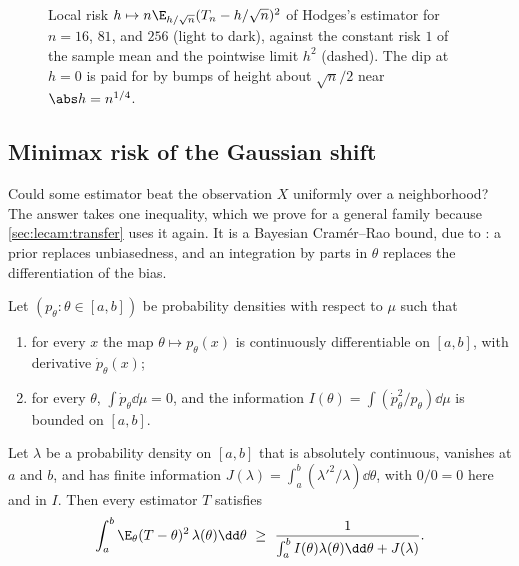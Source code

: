 \begin{refsection}
\begin{figure}[t]
\caption{Local risk $h\mapsto n\E_{h/\sqrt n}(T_n-h/\sqrt n)^2$ of Hodges's estimator for $n=16$, $81$, and $256$ (light to dark), against the constant risk $1$ of the sample mean and the pointwise limit $h^2$ (dashed). The dip at $h=0$ is paid for by bumps of height about $\sqrt n/2$ near $\abs h=n^{1/4}$.}
\label{fig:lecam:hodges}
\end{figure}

\subsection{Minimax risk of the Gaussian shift}

Could some estimator beat the observation $X$ uniformly over a neighborhood? The answer takes one inequality, which we prove for a general family because \cref{sec:lecam:transfer} uses it again. It is a Bayesian Cramér--Rao bound, due to \textcite{vanTrees1968}: a prior replaces unbiasedness, and an integration by parts in $\theta$ replaces the differentiation of the bias.

\begin{lemma}\label{lem:lecam:vantrees}
Let $(p_\theta:\theta\in[a,b])$ be probability densities with respect to $\mu$ such that
\begin{enumerate}[label=(\alph*)]
\item for every $x$ the map $\theta\mapsto p_\theta(x)$ is continuously differentiable on $[a,b]$, with derivative $\dot p_\theta(x)$;
\item for every $\theta$, $\int\dot p_\theta\dd\mu=0$, and the information $I(\theta)=\int(\dot p_\theta^2/p_\theta)\dd\mu$ is bounded on $[a,b]$.
\end{enumerate}
Let $\lambda$ be a probability density on $[a,b]$ that is absolutely continuous, vanishes at $a$ and $b$, and has finite information $J(\lambda)=\int_a^b(\lambda'^2/\lambda)\dd\theta$, with $0/0=0$ here and in $I$. Then every estimator $T$ satisfies
\[
  \int_a^b\E_\theta(T-\theta)^2\,\lambda(\theta)\dd\theta\ \ge\ \frac1{\int_a^bI(\theta)\lambda(\theta)\dd\theta+J(\lambda)}.
\]
\end{lemma}


\end{refsection}
